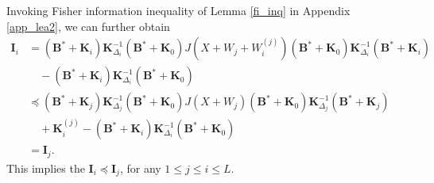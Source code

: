 \documentclass[journal,final, onecolumn]{IEEEtran}
\begin{document}
Invoking Fisher information inequality of Lemma \ref{fi_inq} in Appendix \ref{app_lea2}, we can further obtain
\begin{align}
\boldsymbol{I}_{i} &= (\boldsymbol{B}^{*} + \boldsymbol{K}_{i}) \boldsymbol{K}^{-1}_{\Delta_{i}}(\boldsymbol{B}^{*} + \boldsymbol{K}_{0}) J(X+W_j+W^{(j)}_{i})(\boldsymbol{B}^{*} + \boldsymbol{K}_{0}) \boldsymbol{K}^{-1}_{\Delta_{i}}(\boldsymbol{B}^{*} + \boldsymbol{K}_{i})\nonumber \\
&\quad  -(\boldsymbol{B}^{*} + \boldsymbol{K}_{i}) \boldsymbol{K}^{-1}_{\Delta_{i}}(\boldsymbol{B}^{*} + \boldsymbol{K}_{0})\\
&\preceq (\boldsymbol{B}^{*} + \boldsymbol{K}_{j}) \boldsymbol{K}^{-1}_{\Delta_{j}}(\boldsymbol{B}^{*} + \boldsymbol{K}_{0}) J(X+W_j)(\boldsymbol{B}^{*} + \boldsymbol{K}_{0}) \boldsymbol{K}^{-1}_{\Delta_{j}}(\boldsymbol{B}^{*} + \boldsymbol{K}_{j})\nonumber \\
&\quad +\boldsymbol{K}^{(j)}_{i} -(\boldsymbol{B}^{*} + \boldsymbol{K}_{i}) \boldsymbol{K}^{-1}_{\Delta_{i}}(\boldsymbol{B}^{*} + \boldsymbol{K}_{0})\\
&=\boldsymbol{I}_{j}.
\end{align}
This implies the $\boldsymbol{I}_{i} \preceq\boldsymbol{I}_{j}$, for any $1 \leq j \leq i \leq L $.
\end{document}
